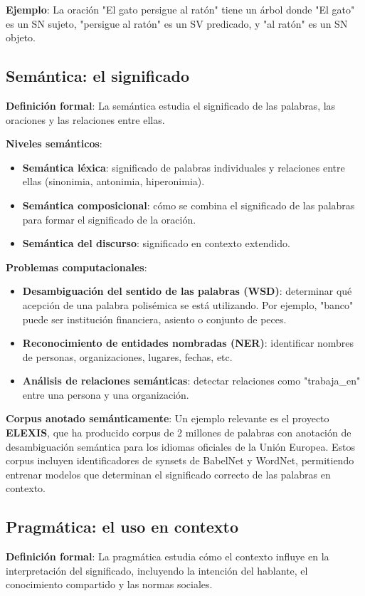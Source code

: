 \documentclass[12pt,a4paper,openany,oneside]{book}
\begin{document}
\textbf{Ejemplo}: La oración "El gato persigue al ratón" tiene un árbol donde "El gato" es un SN sujeto, "persigue al ratón" es un SV predicado, y "al ratón" es un SN objeto.

\subsection{Semántica: el significado}
\textbf{Definición formal}: La semántica estudia el significado de las palabras, las oraciones y las relaciones entre ellas.

\textbf{Niveles semánticos}:
\begin{itemize}
    \item \textbf{Semántica léxica}: significado de palabras individuales y relaciones entre ellas (sinonimia, antonimia, hiperonimia).
    \item \textbf{Semántica composicional}: cómo se combina el significado de las palabras para formar el significado de la oración.
    \item \textbf{Semántica del discurso}: significado en contexto extendido.
\end{itemize}

\textbf{Problemas computacionales}:
\begin{itemize}
    \item \textbf{Desambiguación del sentido de las palabras (WSD)}: determinar qué acepción de una palabra polisémica se está utilizando. Por ejemplo, "banco" puede ser institución financiera, asiento o conjunto de peces.
    \item \textbf{Reconocimiento de entidades nombradas (NER)}: identificar nombres de personas, organizaciones, lugares, fechas, etc.
    \item \textbf{Análisis de relaciones semánticas}: detectar relaciones como "trabaja\_en" entre una persona y una organización.
\end{itemize}

\textbf{Corpus anotado semánticamente}: Un ejemplo relevante es el proyecto \textbf{ELEXIS}, que ha producido corpus de 2 millones de palabras con anotación de desambiguación semántica para los idiomas oficiales de la Unión Europea. Estos corpus incluyen identificadores de synsets de BabelNet y WordNet, permitiendo entrenar modelos que determinan el significado correcto de las palabras en contexto.

\subsection{Pragmática: el uso en contexto}
\textbf{Definición formal}: La pragmática estudia cómo el contexto influye en la interpretación del significado, incluyendo la intención del hablante, el conocimiento compartido y las normas sociales.
\end{document}
